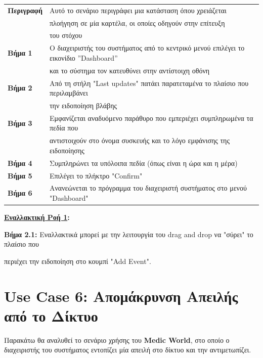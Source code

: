 \documentclass{article}
\newcommand\T{\rule{0pt}{2.6ex}}       %
\newcommand\B{\rule[-1.2ex]{0pt}{0pt}}
\begin{document}
 \begin{center}
     \begin{tabular}{|l|l|}
     \hline
      \textbf{Περιγραφή} & Αυτό το σενάριο περιγράφει μια κατάσταση όπου χρειάζεται \T \\& πλοήγηση σε μία καρτέλα, οι οποίες οδηγούν στην επίτευξη \\& του στόχου \B \\ 
      \hline
      \textbf{Βήμα 1} & Ο διαχειριστής του συστήματος από το κεντρικό μενού επιλέγει το εικονίδιο ”Dashboard” \T \\& και το σύστημα τον κατευθύνει στην αντίστοιχη οθόνη \B \\
      \hline
      \textbf{Βήμα 2} & Από τη στήλη "Last updates" πατάει παρατεταμένα το πλαίσιο που περιλαμβάνει \T \\& την ειδοποίηση βλάβης \B \\
      \hline
      \textbf{Βήμα 3} & Εμφανίζεται αναδυόμενο παράθυρο που εμπεριέχει συμπληρωμένα τα πεδία που \T \\& αντιστοιχούν στο όνομα συσκευής και το λόγο εμφάνισης της ειδοποίησης \B \\
      \hline
      \textbf{Βήμα 4} & Συμπληρώνει τα υπόλοιπα πεδία (όπως είναι η ώρα και η μέρα) \T\B \\
      \hline
      \textbf{Βήμα 5} &  Επιλέγει το πλήκτρο "Confirm" 
      \T\B \\
      \hline
      \textbf{Βήμα 6} & Ανανεώνεται το πρόγραμμα του διαχειριστή συστήματος στο μενού "Dashboard" \T\B \\
      \hline
     \end{tabular}
 \end{center}
 
 \vspace{0.3cm}
 
\textbf{\underline{Εναλλακτική Ροή 1}:} \newline
\par \textbf{Βήμα 2.1:} Εναλλακτικά μπορεί με την λειτουργία του drag and drop να "σύρει" το πλαίσιο που \par περιέχει την ειδοποίηση στο κουμπί "Add Event".


\section{Use Case 6: Απομάκρυνση Απειλής από το Δίκτυο}

Παρακάτω θα αναλυθεί το σενάριο χρήσης του \textbf{Medic World}, στο οποίο ο διαχειριστής του συστήματος εντοπίζει μία απειλή στο δίκτυο και την αντιμετωπίζει.
\end{document}
